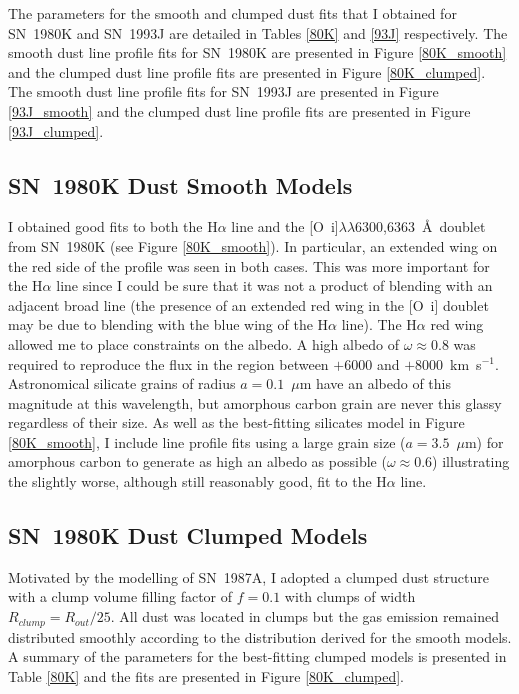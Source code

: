 The parameters for the smooth and clumped dust fits  that I obtained for SN~1980K and SN~1993J are detailed in Tables \ref{80K} and \ref{93J} respectively. The smooth dust line profile fits for SN~1980K are presented in Figure \ref{80K_smooth} and the clumped dust line profile fits are presented in Figure \ref{80K_clumped}.  The smooth dust line profile fits for SN~1993J are presented in Figure \ref{93J_smooth} and the clumped dust line profile fits are presented in Figure \ref{93J_clumped}.  

\subsection{SN~1980K Dust Smooth Models}

I obtained good fits to both the H$\alpha$ line and the [O~{\sc i}]$\lambda\lambda$6300,6363~\AA\  doublet from SN~1980K (see Figure \ref{80K_smooth}).  In particular, an extended wing on the red side of the profile was seen in both cases. This was more important for the H$\alpha$ line since I could be sure that it was not a product of blending with an adjacent broad line (the presence of an extended red wing in the [O~{\sc i}] doublet may be due to blending with the blue wing of the H$\alpha$ line).  The H$\alpha$ red wing allowed me to place constraints on the albedo.  A high albedo of $\omega\approx0.8$  was required to reproduce the flux in the region between $+6000$ and $+8000$~km~s$^{-1}$.  Astronomical silicate grains \citep{Draine1984} of radius $a=0.1$~$\mu$m have an albedo of this magnitude at this wavelength, but amorphous carbon grain are never this glassy regardless of their size.  As well as the best-fitting silicates model in Figure \ref{80K_smooth}, I include line profile fits using a large grain size ($a=3.5$~$\mu$m) for amorphous carbon to generate as high an albedo as possible ($\omega\approx0.6$) illustrating the slightly worse, although still reasonably good, fit to the H$\alpha$ line.  

\subsection{SN~1980K Dust Clumped Models}

Motivated by the modelling of SN~1987A, I adopted a clumped dust structure with a clump volume filling factor of $f=0.1$ with clumps of width $R_{clump}=R_{out}/25$.  All dust was located in clumps but the gas emission remained distributed smoothly according to the distribution derived for the smooth models.  A summary of the parameters for the best-fitting clumped models is presented in Table \ref{80K} and the fits are presented in Figure \ref{80K_clumped}.

